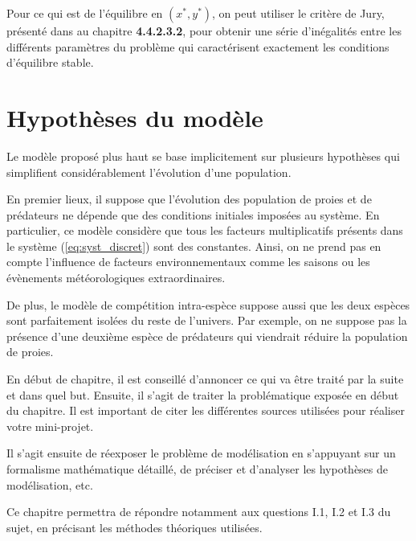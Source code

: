 Pour ce qui est de l'équilibre en $(x^*, y^*)$, on peut utiliser le critère de Jury, présenté dans \cite{Chevet22fr} au chapitre \textbf{4.4.2.3.2}, pour obtenir une série d'inégalités entre les différents paramètres du problème qui caractérisent exactement les conditions d'équilibre stable.

\section{Hypothèses du modèle}
\label{sec:Hypotheses}

Le modèle proposé plus haut se base implicitement sur plusieurs hypothèses qui simplifient considérablement l'évolution d'une population.

En premier lieux, il suppose que l'évolution des population de proies et de prédateurs ne dépende que des conditions initiales imposées au système. En particulier, ce modèle considère que tous les facteurs multiplicatifs présents dans le système (\ref{eq:syst_discret}) sont des constantes. Ainsi, on ne prend pas en compte l'influence de facteurs environnementaux comme les saisons ou les évènements météorologiques extraordinaires.

De plus, le modèle de compétition intra-espèce suppose aussi que les deux espèces sont parfaitement isolées du reste de l'univers. Par exemple, on ne suppose pas la présence d'une deuxième espèce de prédateurs qui viendrait réduire la population de proies.
\vspace{15pt}


En début de chapitre, il est conseillé d'annoncer ce qui va être traité par la suite et dans quel but. Ensuite, il s’agit de traiter la problématique exposée en début du chapitre. Il est important de citer les différentes sources utilisées pour réaliser votre mini-projet.

Il s'agit ensuite de réexposer le problème de modélisation en s’appuyant sur un formalisme mathématique détaillé, de préciser et d'analyser les hypothèses de modélisation, etc.

Ce chapitre permettra de répondre notamment aux questions I.1, I.2 et I.3 du sujet, en précisant les méthodes théoriques utilisées.